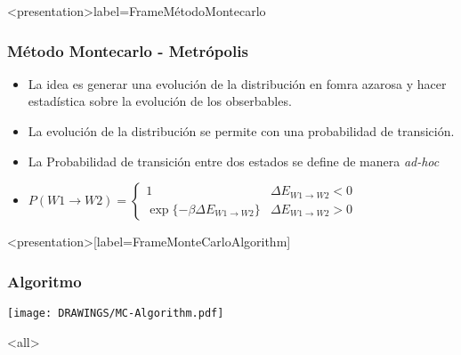 \mode*

\begin{frame}<presentation>{label=FrameMétodoMontecarlo}
  \frametitle{Método Montecarlo - Metrópolis}
  \begin{itemize}
     \item La idea es generar una evolución de la distribución en fomra azarosa
     y hacer estadística sobre la evolución de los obserbables.
     \item La evolución de la distribución se permite con una probabilidad de transición.
     \item La Probabilidad de transición entre dos estados se define de manera \emph{ ad-hoc}
     \item 
       $P( W1 \longrightarrow W2 ) = 
       \left\{ 
       \begin{array}{ll}
	 1 & \Delta E _{ W1 \rightarrow W2 } <0 \\
	 \exp \{- \beta \Delta E_{ W1 \rightarrow W2 }\} & \Delta E _{ W1 \rightarrow W2 } >0
       \end{array}
       \right.
       $
      
  \end{itemize}
\end{frame}

\begin{frame}<presentation>[label=FrameMonteCarloAlgorithm]
  \frametitle{Algoritmo}
   
  \texttt{[image: DRAWINGS/MC-Algorithm.pdf]}

\end{frame}
\mode<all>
